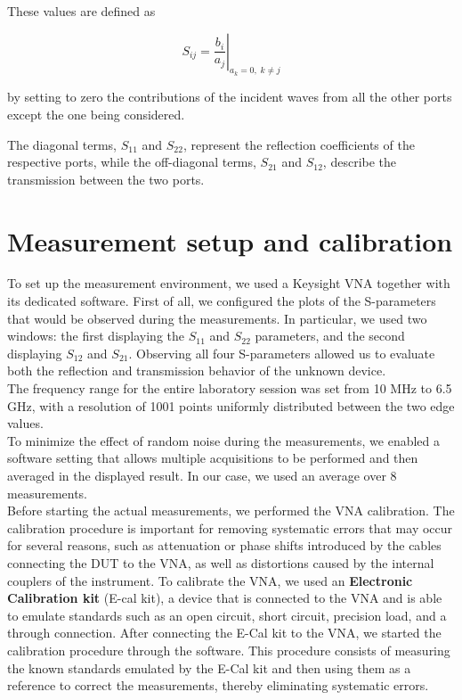 These values are defined as

\[
S_{ij} = \left.\frac{b_i}{a_j}\right|_{a_k=0,\;k\neq j}
\]

by setting to zero the contributions of the incident waves from all the other ports except the one being considered.


The diagonal terms, $S_{11}$ and $S_{22}$, represent the reflection coefficients of the respective ports, while the off-diagonal terms, $S_{21}$ and $S_{12}$, describe the transmission between the two ports.

\section{Measurement setup and calibration}
To set up the measurement environment, we used a Keysight VNA together with its dedicated software. First of all, we configured the plots of the S-parameters that would be observed during the measurements. In particular, we used two windows: the first displaying the $S_{11}$ and $S_{22}$ parameters, and the second displaying $S_{12}$ and $S_{21}$. Observing all four S-parameters allowed us to evaluate both the reflection and transmission behavior of the unknown device.\\
The frequency range for the entire laboratory session was set from 10 MHz to 6.5 GHz, with
a resolution of 1001 points uniformly distributed between the two edge values.\\
To minimize the effect of random noise during the measurements, we enabled a software setting that allows multiple acquisitions to be performed and then averaged in the displayed result. In our case, we used an average over 8 measurements.\\

Before starting the actual measurements, we performed the VNA calibration. The calibration procedure is important for removing systematic errors that may occur for several reasons, such as attenuation or phase shifts introduced by the cables connecting
the DUT to the VNA, as well as distortions caused by the internal couplers of the instrument.
To calibrate the VNA, we used an \textbf{Electronic Calibration kit} (E-cal kit), a device that is connected to the VNA and is able to emulate standards such as an open circuit, short circuit, precision load, and a through connection.
After connecting the E-Cal kit to the VNA, we started the calibration procedure through the software. This procedure consists of measuring the known standards emulated by the E-Cal kit and then using them as a reference to correct the measurements, thereby eliminating systematic errors.